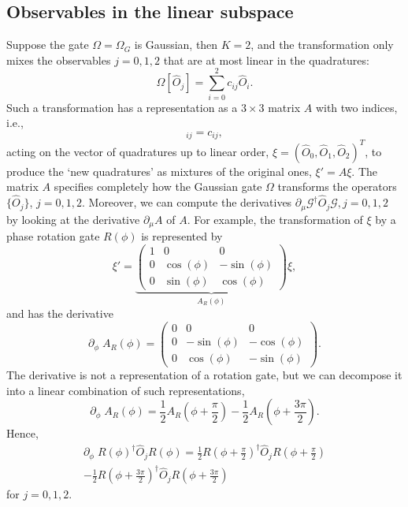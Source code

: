 \documentclass[aps,pra,10pt,twocolumn,groupedaddress,nofootinbib]{revtex4-1}
\theoremstyle{plain}
\begin{document}
\subsection{Observables in the linear subspace}
Suppose the gate $\Omega = \Omega_G$ is Gaussian, then $K=2$, and the transformation only mixes the observables $j=0,1,2$ that are at most linear in the quadratures: 
\begin{equation}
 \Omega[\hat{O}_j] = \sum_{i=0}^2 c_{ij} \hat{O}_i.
 \label{Eq:omega_gaussian}
\end{equation}
Such a transformation has a representation as a $3\times 3$ matrix $A$ with two indices, i.e., 
\begin{equation}
 [A]_{ij} = c_{ij},
\end{equation}
acting on the vector of quadratures up to linear order, $\xi = (\hat{O}_0, \hat{O}_1, \hat{O}_2)^T$, to produce the `new quadratures' as mixtures of the original ones, $\xi' = A \xi$. The matrix $A$ specifies completely how the Gaussian gate $\Omega$ transforms the operators $\{\hat{O}_j\}$, $j=0,1,2$. Moreover, we can compute the derivatives $\partial_{\mu} \mathcal{G}^\dagger \hat{O}_j \mathcal{G}, j=0,1,2$ by looking at the derivative  $\partial_{\mu}A$ of $A$. For example, the transformation of $\xi$ by a phase rotation gate $R(\phi)$ is represented by 
\[
	\xi' =  \underbrace{
	\begin{pmatrix} 
	1 & 0 & 0 \\ 
	0 & \cos(\phi) & -\sin(\phi) \\ 
	0 & \sin(\phi) & \cos(\phi) 
	\end{pmatrix}}_{A_R(\phi)} \xi, 
\]
and has the derivative
\[ 
	\partial_{\phi} \; A_R(\phi) = 
	\begin{pmatrix}0 & 0 & 0 \\ 
	0 &  -\sin(\phi) & -\cos(\phi) \\ 
	0 & \cos(\phi) & -\sin(\phi) 
	\end{pmatrix}.
\]
The derivative is not a representation of a rotation gate, but we can decompose it into a linear combination of such representations,
\[\partial_{\phi} \; A_R(\phi) =  \frac{1}{2} A_R(\phi + \frac{\pi}{2}) - \frac{1}{2} A_R(\phi + \frac{3\pi}{2}). \]  
Hence, 
\begin{multline}
	\partial_{\phi} \; R(\phi)^{\dagger} \hat{O}_j R(\phi) = \frac{1}{2}R(\phi+ \frac{\pi}{2})^{\dagger} \hat{O}_j R(\phi+ \frac{\pi}{2}) \\ 
	- \frac{1}{2} R(\phi+ \frac{3\pi}{2})^{\dagger} \hat{O}_j R(\phi+ \frac{3\pi}{2})
\end{multline}
for $j = 0,1,2$. \\
\end{document}
